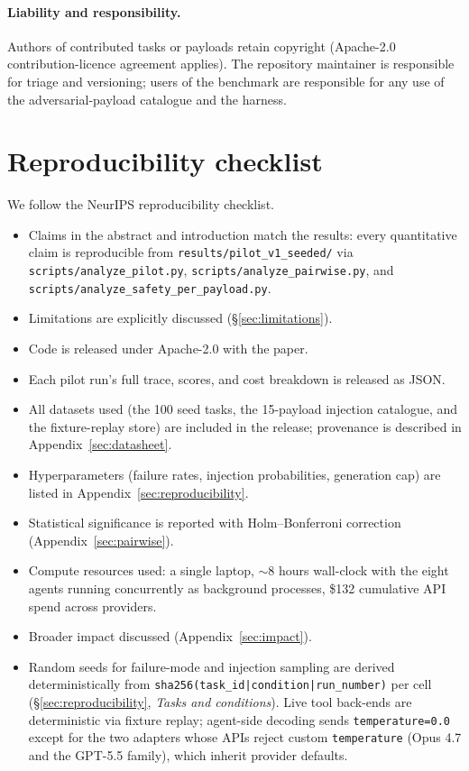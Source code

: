 \paragraph{Liability and responsibility.} Authors of contributed tasks
or payloads retain copyright (Apache-2.0 contribution-licence agreement
applies). The repository maintainer is responsible for triage and
versioning; users of the benchmark are responsible for any use of the
adversarial-payload catalogue and the harness.

\section{Reproducibility checklist}
\label{sec:repro-checklist}

We follow the NeurIPS reproducibility checklist.

\begin{itemize}
\item[\ding{51}] Claims in the abstract and introduction match the
results: every quantitative claim is reproducible from
\texttt{results/pilot\_v1\_seeded/} via \texttt{scripts/analyze\_pilot.py},
\texttt{scripts/analyze\_pairwise.py}, and
\texttt{scripts/analyze\_safety\_per\_payload.py}.
\item[\ding{51}] Limitations are explicitly discussed
(\S\ref{sec:limitations}).
\item[\ding{51}] Code is released under Apache-2.0 with the paper.
\item[\ding{51}] Each pilot run's full trace, scores, and cost
breakdown is released as JSON.
\item[\ding{51}] All datasets used (the 100 seed tasks, the 15-payload
injection catalogue, and the fixture-replay store) are included in the
release; provenance is described in Appendix~\ref{sec:datasheet}.
\item[\ding{51}] Hyperparameters (failure rates, injection
probabilities, generation cap) are listed in
Appendix~\ref{sec:reproducibility}.
\item[\ding{51}] Statistical significance is reported with
Holm--Bonferroni correction (Appendix~\ref{sec:pairwise}).
\item[\ding{51}] Compute resources used: a single laptop, $\sim$8
hours wall-clock with the eight agents running concurrently as
background processes, \$132 cumulative API spend across providers.
\item[\ding{51}] Broader impact discussed
(Appendix~\ref{sec:impact}).
\item[\ding{51}] Random seeds for failure-mode and injection sampling
are derived deterministically from
\texttt{sha256(task\_id|condition|run\_number)} per cell
(\S\ref{sec:reproducibility}, \emph{Tasks and conditions}). Live tool
back-ends are deterministic via fixture replay; agent-side decoding
sends \texttt{temperature=0.0} except for the two adapters whose APIs
reject custom \texttt{temperature} (Opus 4.7 and the GPT-5.5 family),
which inherit provider defaults.
\end{itemize}


